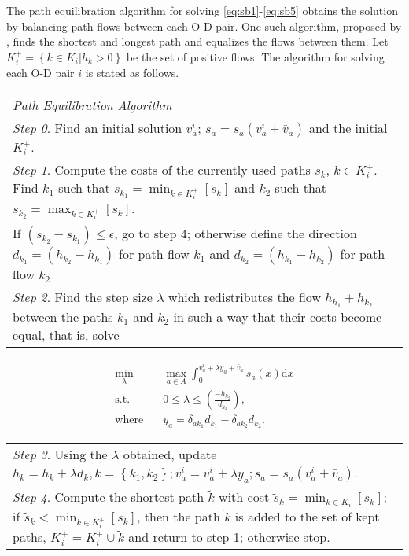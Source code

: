 The path equilibration algorithm for solving \ref{eq:sb1}-\ref{eq:sb5} 
obtains the solution by balancing path flows between each O-D pair.
One such algorithm, proposed by \cite{Dafermos}, 
finds the shortest and longest path and equalizes the flows between them.
Let $K_i^{+} = \left\{ k \in K_i | h_k > 0 \right\}$ be the set of positive flows.
The algorithm for solving each O-D pair $i$ is stated as follows.
\begin{table}[H]
    \begin{tabular}{ m{} }
        \hspace{-.5cm}\emph{Path Equilibration Algorithm} \\
        \emph{Step 0}. Find an initial solution $v_a^i$; $s_a = s_a(v_a^i+\bar{v}_a)$ and the initial $K_i^+$.\\
        \emph{Step 1}. Compute the costs of the currently used paths $s_k$, $k \in K_i^+$. Find $k_1$ such that $s_{k_1} = \displaystyle \min_{k \in K_i^+} \left[ s_k \right]$ and $k_2$ such that $s_{k_2} = \displaystyle \max_{k \in K_i^+} \left[s_k \right]$.\\
        If $(s_{k_2} - s_{k_1}) \leq \epsilon$, go to step 4;
        otherwise define the direction $d_{k_1} = (h_{k_2} - h_{k_1})$ for path flow $k_1$ and $d_{k_2} = (h_{k_1} - h_{k_2})$ for path flow $k_2$\\
        \emph{Step 2}. Find the step size $\lambda$ which redistributes the flow $h_{h_1} + h_{k_2}$ between the paths $k_1$ and $k_2$ in such a way that their costs become equal, that is, solve
    \end{tabular}
\end{table}

\begin{align}
    \min_\lambda & \quad \max_{a \in A} \int_0^{v_a^i + \lambda y_a + \bar{v}_a} s_a(x) \mathrm{d}x \\
    \text{s.t.} & \quad 0 \leq \lambda \leq \left( \frac{-h_{k_2}}{d_{k_2}} \right), \\
    \text{where} & \quad y_a = \delta_{ak_1} d_{k_1} - \delta_{ak_2} d_{k_2}.
\end{align}

\begin{table}
    \begin{tabular}{ m{} }
        \emph{Step 3}. Using the $\lambda$ obtained, update $h_k = h_k + \lambda d_k, k = \left\{ k_1, k_2 \right\}; v_a^i = v_a^i + \lambda y_a; s_a = s_a(v_a^i + \bar{v}_a)$. \\
        \emph{Step 4}. Compute the shortest path $\tilde{k}$ with cost $\tilde{s}_k = \displaystyle \min_{k \in K_i} \left[ s_k \right]$;
        if $\tilde{s}_k < \displaystyle \min_{k \in K_i^+} \left[ s_k \right]$, then the path $\tilde{k}$ is added to the set of kept paths, $K_i^+ = K_i^+ \cup \tilde{k}$ and return to step 1; otherwise stop.
    \end{tabular}
\end{table}


